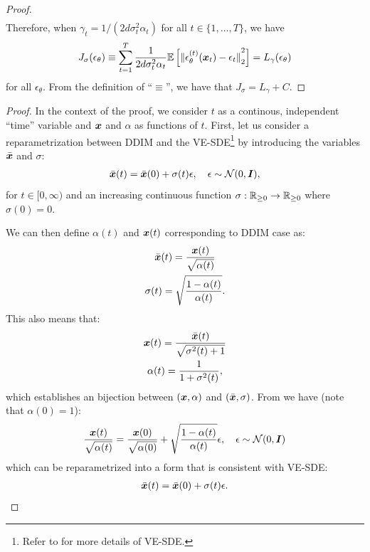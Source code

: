 \begin{proof}
\begin{align}
\end{align}
Therefore, when $\gamma_t = 1 / (2 d \sigma_t^2 \alpha_t)$ for all $t \in \{1, \ldots, T\}$, we have
\begin{align}
    J_\sigma(\epsilon_\theta) \equiv \sum_{t=1}^{T} \frac{1}{2 d \sigma_t^2 \alpha_t} {\mathbb{E}}\left[{\lVert {\epsilon_{\theta}^{(t)}({\bm{x}}_t) - \epsilon_t} \rVert}_2^2 \right] = L_\gamma(\epsilon_\theta)
\end{align}
for all $\epsilon_\theta$. From the definition of ``$\equiv$'', we have that $J_\sigma = L_\gamma + C$.
\end{proof}

\equivalence*

\begin{proof}
In the context of the proof, we consider $t$ as a continous, independent ``time'' variable and ${\bm{x}}$ and $\alpha$ as functions of $t$. First, let us consider a reparametrization between DDIM and the VE-SDE\footnote{Refer to \citep{song2020score} for more details of VE-SDE.} by introducing the variables $\bar{{\bm{x}}}$ and $\sigma$:
\begin{align}
    \bar{{\bm{x}}}(t) = \bar{{\bm{x}}}(0) + \sigma(t) \epsilon, \quad \epsilon \sim {\mathcal{N}}(0, {\bm{I}}),
\end{align}
for $t \in [0, \infty)$ and an increasing continuous function $\sigma: {\mathbb{R}}_{\geq 0} \to {\mathbb{R}}_{\geq 0}$ where $\sigma(0) = 0$. 

We can then define $\alpha(t)$ and ${\bm{x}}(t)$ corresponding to DDIM case as:
\begin{gather}
    \bar{{\bm{x}}}(t) = \frac{{\bm{x}}(t)}{\sqrt{\alpha(t)}} \\
    \sigma(t) = \sqrt{\frac{1 - \alpha(t)}{\alpha(t)}}.
\end{gather}
This also means that:
\begin{gather}
    {\bm{x}}(t) = \frac{\bar{{\bm{x}}}(t)}{\sqrt{\sigma^2(t) + 1}} \\
    \alpha(t) = \frac{1}{1 + \sigma^2(t)},
\end{gather}
which establishes an bijection between $({\bm{x}}, \alpha)$ and $(\bar{{\bm{x}}}, \sigma)$. From  we have (note that $\alpha(0) = 1$):
\begin{align}
    \frac{{\bm{x}}(t)}{\sqrt{\alpha(t)}} = \frac{{\bm{x}}(0)}{\sqrt{\alpha(0)}} + \sqrt{\frac{1 - \alpha(t)}{\alpha(t)}} \epsilon, \quad \epsilon \sim {\mathcal{N}}(0, {\bm{I}})
\end{align}
which can be reparametrized into a form that is consistent with VE-SDE:
\begin{align}
    \bar{{\bm{x}}}(t) = \bar{{\bm{x}}}(0) + \sigma(t) \epsilon.
\end{align}


\end{proof}
